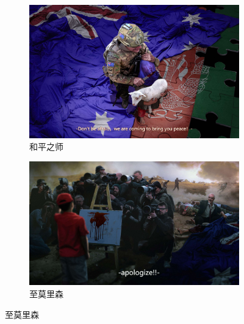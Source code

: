 \documentclass[zihao = -4, linespread = 1.5]{ctexart}
\begin{document}
\begin{figure}[htbp]
     \centering
     \begin{subfigure}[b]{.5\linewidth - 1mm}
         \centering
         \includegraphics[width=\textwidth,trim=0 12 0 12,clip]{picture/和平之师.jpg} %
         \caption{和平之师}
         \label{fig:HePingZhiShi}
     \end{subfigure}
     \hfill
     \begin{subfigure}[b]{.5\linewidth - 1mm}
         \centering
         \includegraphics[width=\textwidth]{picture/至莫里森.jpg}
         \caption{至莫里森}
         \label{fig:ZhiMoLiSen}
     \end{subfigure}


\end{figure}
\end{document}
